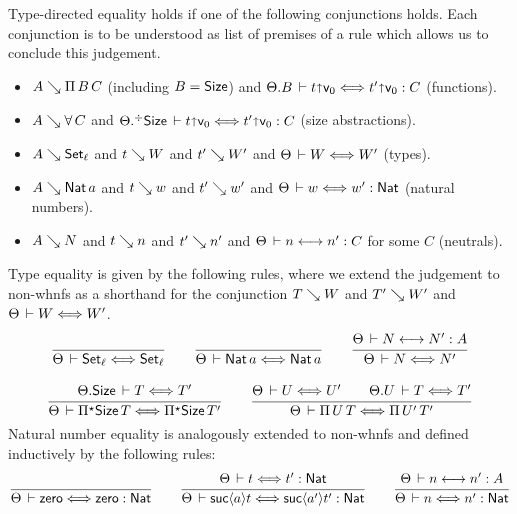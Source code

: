 \documentclass[acmlarge,review,anonymous]{acmart}\settopmatter{printfolios=true}
\begin{document}
Type-directed equality  holds if one
of the following conjunctions holds.  Each conjunction is to be understood as list of premises of
a rule which allows us to conclude this judgement.
\begin{itemize}
\item %
  $A \evalsto \piT B C$ (including $B = \Size$) and
  $\cext \The B \der t \slift \ind0 \eqchk t' \slift \ind0 : C$
  (functions).
\item %
  $A \evalsto \forallT C$ and
  $\erext \The \Size \der t \slift \ind0 \eqchk t' \slift \ind0 : C$
  (size abstractions).
\item %
  $A \evalsto \Set[\ell]$ and $t \evalsto W$ and $t' \evalsto W'$ and
  $\The \der W \eqchk W'$
  (types).
\item %
  $A \evalsto \Nat a$ and $t \evalsto w$ and $t' \evalsto w'$ and
  $\EqNat \The w {w'}$
  (natural numbers).
\item %
  $A \evalsto N$ and $t \evalsto n$ and $t' \evalsto n'$ and
  $\The \der n \eqinf n' : C$ for some $C$
  (neutrals).
\end{itemize}
Type equality  is given by the following rules,
where we extend the judgement to non-whnfs 
as a shorthand for the conjunction $T \evalsto W$ and $T' \evalsto W'$ and $\The \der W \eqchk W'$.
\begin{gather*}
  \ru{
    }{\The \der \Set[\ell] \eqchk \Set[\ell]}
\qquad
  \ru{
    }{\The \der \Nat a \eqchk \Nat a}
\qquad
  \ru{\The \der N \eqinf N' : A
    }{\The \der N \eqchk N'}
\\[2ex]
  \ru{\cext \The \Size \der T \eqchk T'
    }{\The \der \epiT \Size T \eqchk \epiT \Size T'}
\qquad
  \ru{\The \der U \eqchk U' \qquad
      \cext \The U \der T \eqchk T'
    }{\The \der \piT U T \eqchk \piT {U'} {T'}}
\end{gather*}
Natural number equality  is analogously extended to non-whnfs  and defined inductively by the following rules:
\begin{gather*}
  \ru{}{\EqNat \The \tzero \tzero}
\qquad
  \ru{\EqNat \The t {t'}
    }{\EqNat \The {\suc a t}{\suc {a'} {t'}}}
\qquad
  \ru{\The \der n \eqinf n' : A
    }{\EqNat \The n {n'}}
\end{gather*}
\end{document}
